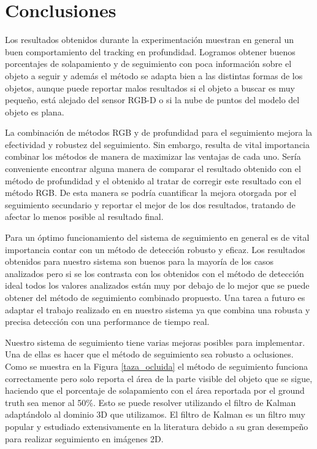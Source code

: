 \chapter{Conclusiones}\label{chap:conclusiones}
Los resultados obtenidos durante la experimentación muestran en general un buen comportamiento del tracking en profundidad. Logramos obtener buenos porcentajes de solapamiento y de seguimiento con poca información sobre el objeto a seguir y además el método se adapta bien a las distintas formas de los objetos, aunque puede reportar malos resultados si el objeto a buscar es muy pequeño, está alejado del sensor RGB-D o si la nube de puntos del modelo del objeto es plana.

La combinación de métodos RGB y de profundidad para el seguimiento mejora la efectividad y robustez del seguimiento. Sin embargo, resulta de vital importancia combinar los métodos de manera de maximizar las ventajas de cada uno. Sería conveniente encontrar alguna manera de comparar el resultado obtenido con el método de profundidad y el obtenido al tratar de corregir este resultado con el método RGB. De esta manera se podría cuantificar la mejora otorgada por el seguimiento secundario y reportar el mejor de los dos resultados, tratando de afectar lo menos posible al resultado final.

Para un óptimo funcionamiento del sistema de seguimiento en general es de vital importancia contar con un método de detección robusto y eficaz. Los resultados obtenidos para nuestro sistema son buenos para la mayoría de los casos analizados pero si se los contrasta con los obtenidos con el método de detección ideal todos los valores analizados están muy por debajo de lo mejor que se puede obtener del método de seguimiento combinado propuesto. Una tarea a futuro es adaptar el trabajo realizado en \cite{hinterstoisser2010dominant} en nuestro sistema ya que combina una robusta y precisa detección con una performance de tiempo real.

Nuestro sistema de seguimiento tiene varias mejoras posibles para implementar. Una de ellas es hacer que el método de seguimiento sea robusto a oclusiones. Como se muestra en la Figura \ref{taza_ocluida} el método de seguimiento funciona correctamente pero solo reporta el área de la parte visible del objeto que se sigue, haciendo que el porcentaje de solapamiento con el área reportada por el ground truth sea menor al 50\%. Esto se puede resolver utilizando el filtro de Kalman \cite{welch1995introduction} adaptándolo al dominio 3D que utilizamos. El filtro de Kalman es un filtro muy popular y estudiado extensivamente en la literatura \cite{julier1997new,wan2000unscented} debido a su gran desempeño para realizar seguimiento en imágenes 2D.

